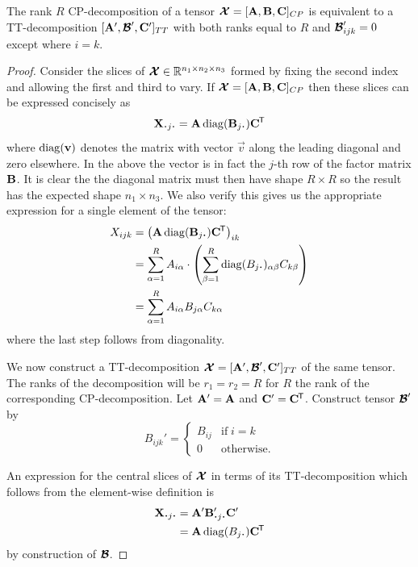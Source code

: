 \begin{prop}
The rank \(R\) CP-decomposition of a tensor \(\bm{\mathcal{X}} = [\mathbf{A},\mathbf{B},\mathbf{C}]_{CP}\) is
equivalent to a TT-decomposition \([\mathbf{A}', \bm{\mathcal{B}}', \mathbf{C}']_{TT}\) with both ranks
equal to \(R\) and \(\bm{\mathcal{B}}'_{ijk} = 0\) except where \(i=k\).
\end{prop}
\begin{proof}
Consider the slices of \(\bm{\mathcal{X}} \in \mathbb{R}^{n_1 \times n_2 \times n_3}\) formed by fixing the
second index and allowing the first and third to vary. If 
\(\bm{\mathcal{X}} = [\mathbf{A}, \mathbf{B}, \mathbf{C}]_{CP}\) then these slices can be expressed concisely as
\begin{equation} \label{eq:cp-slice}
	\mat{X}_{\midbullet j \midbullet} = \mat{A}\diag({\mat{B}_{j\midbullet}})\tran{\mat{C}}
\end{equation} where \(\operatorname{diag}(\mathbf{v})\) denotes the matrix with vector \(\vec{v}\) along the
leading diagonal and zero elsewhere. In the above the vector is in fact the \(j\)-th row of
the factor matrix \(\mathbf{B}\). It is clear the the diagonal matrix must then have shape
\(R \times R\) so the result has the expected shape \(n_1 \times n_3\). We also verify this gives us
the appropriate expression for a single element of the tensor:
\begin{align}
	X_{ijk} &= \left(\mat{A}\diag({\mat{B}_{j\midbullet}})\tran{\mat{C}}\right)_{ik} \\
		    &= \sum_{\alpha=1}^R A_{i\alpha} \cdot
		    	\left(\sum_{\beta=1}^{R} \diag(B_{j\midbullet})_{\alpha\beta} C_{k\beta}\right) \\
			&= \sum_{\alpha=1}^R A_{i\alpha} B_{j\alpha} C_{k\alpha}
\end{align} where the last step follows from diagonality.

We now construct a TT-decomposition \(\bm{\mathcal{X}} = [\mathbf{A}', \bm{\mathcal{B}}', \mathbf{C}']_{TT}\)
of the same tensor. The ranks of the decomposition will be \(r_1 = r_2 = R\) for \(R\) the rank
of the corresponding CP-decomposition.
Let \(\mathbf{A}' = \mathbf{A}\) and \(\mathbf{C}' = \mathbf{C}^{\mkern-1.5mu\mathsf{T}}\). Construct tensor \(\bm{\mathcal{B}}'\)
by
\begin{equation}
	B_{ijk}' = \begin{cases}
		B_{ij} & \text{if}\; i = k \\
		0    & \text{otherwise}.
	\end{cases}
\end{equation}

An expression for the central slices of \(\bm{\mathcal{X}}\) in terms of its TT-decomposition which
follows from the element-wise definition is
\begin{align}
	\mat{X}_{\midbullet j \midbullet} &= \mat{A}'\mat{B}_{\midbullet j \midbullet}'\mat{C}'\\
	&= \mat{A}\diag(B_{j\midbullet})\tran{\mat{C}}
\end{align}
by construction of \(\bm{\mathcal{B}}\).
\end{proof}

